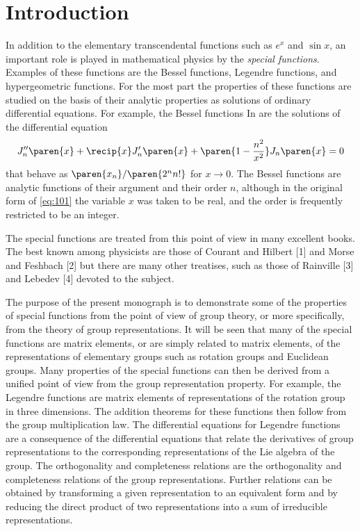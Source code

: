 \chapter{Introduction}

In addition to the elementary transcendental functions such as $e^{x}$ and $\sin x$, an important role is played in mathematical physics by the \emph{special functions}.	Examples of these functions are the Bessel functions, Legendre functions, and hypergeometric functions. For the most part the properties of these functions are studied on the basis of their analytic properties as solutions of ordinary differential equations. For example, the Bessel functions In are the solutions of the differential equation
\begin{equation}
  J_{n}''\paren{x} + \recip{x} J_{n}'\paren{x}  + \paren{1 - \frac{n^{2}}{x^{2}}} J_{n}\paren{x} = 0
  \label{eq:101}
\end{equation}
that behave as $\paren{x_{n}}/\paren{2^{n}n!}$ for $x \to 0$. The Bessel functions are analytic functions of their argument and their order $n$, although in the original form of \eqref{eq:101} the variable $x$ was taken to be real, and the order is frequently restricted to be an integer.

The special functions are treated from this point of view in many excellent books. The best known among physicists are those of Courant and Hilbert [1] and Morse and Feshbach [2] but there are many other treatises, such as those of Rainville [3] and Lebedev [4] devoted to the subject.

The purpose of the present monograph is to demonstrate some of the properties of special functions from the point of view of group theory, or more specifically, from the theory of group representations. It will be seen that many of the special functions are matrix elements, or are simply related to matrix elements, of the representations of elementary groups such as rotation groups and Euclidean
groups. Many properties of the special functions can then be derived from a unified point of view from the group representation property. For example, the Legendre functions are matrix elements of representations of the rotation group in three dimensions. The addition theorems for these functions then follow from the group multiplication law. The differential equations for Legendre functions are a consequence of the differential equations that relate the derivatives of group representations to the corresponding representations of the Lie algebra of the group. The orthogonality and completeness relations are the orthogonality and completeness relations of the group representations. Further relations can be obtained by transforming a given representation to an equivalent form and by reducing the direct product of two representations into a sum of irreducible representations.


